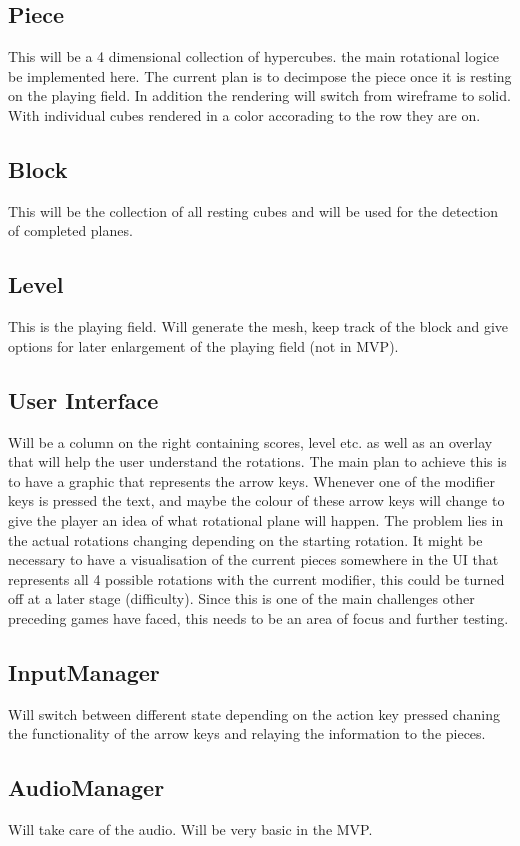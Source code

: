 \documentclass{article}
\begin{document}
\subsection{Piece}
This will be a 4 dimensional collection of hypercubes. the main rotational logice be implemented here. The current plan is to decimpose the piece once it is resting on the playing field. In addition the rendering will switch from wireframe to solid. With individual cubes rendered in a color accorading to the row they are on.
\subsection{Block}
This will be the collection of all resting cubes and will be used for the detection of completed planes.
\subsection{Level}
This is the playing field. Will generate the mesh, keep track of the block and give options for later enlargement of the playing field (not in MVP).
\subsection{User Interface}
Will be a column on the right containing scores, level etc. as well as an overlay that will help the user understand the rotations.
The main plan to achieve this is to have a graphic that represents the arrow keys. Whenever one of the modifier keys is pressed the text, and maybe the colour of these arrow keys will change to give the player an idea of what rotational plane will happen. The problem lies in the actual rotations changing depending on the starting rotation. It might be necessary to have a visualisation of the current pieces somewhere in the UI that represents all 4 possible rotations with the current modifier, this could be turned off at a later stage (difficulty). Since this is one of the main challenges other preceding games have faced, this needs to be an area of focus and further testing. 
\subsection{InputManager}
Will switch between different state depending on the action key pressed chaning the functionality of the arrow keys and relaying the information to the pieces.
\subsection{AudioManager}
Will take care of the audio. Will be very basic in the MVP.
\end{document}
